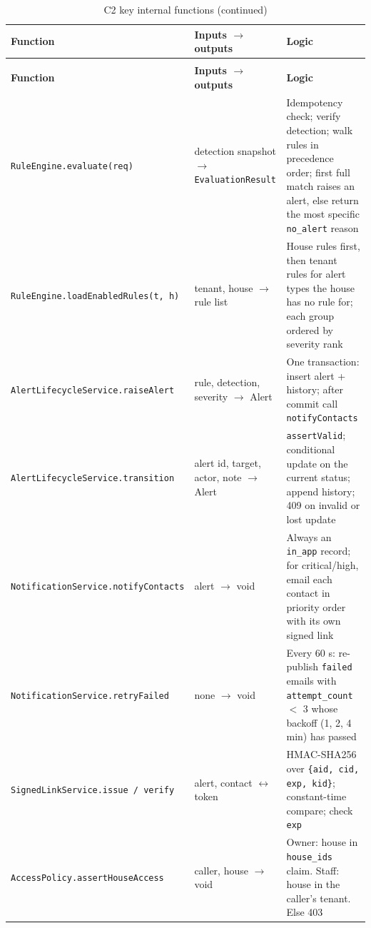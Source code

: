 \begin{longtable}{L{4.0cm}L{4.0cm}L{6.6cm}}
\caption{C2 key internal functions}\label{tab:c2-fn}\\
\toprule
\textbf{Function} & \textbf{Inputs $\rightarrow$ outputs} & \textbf{Logic} \\
\midrule
\endfirsthead
\caption[]{C2 key internal functions (continued)}\\
\toprule
\textbf{Function} & \textbf{Inputs $\rightarrow$ outputs} & \textbf{Logic} \\
\midrule
\endhead
\texttt{RuleEngine.\allowbreak evaluate(req)} & detection snapshot $\rightarrow$ \texttt{EvaluationResult} & Idempotency check; verify detection; walk rules in precedence order; first full match raises an alert, else return the most specific \texttt{no\_alert} reason \\
\texttt{RuleEngine.\allowbreak loadEnabledRules(t, h)} & tenant, house $\rightarrow$ rule list & House rules first, then tenant rules for alert types the house has no rule for; each group ordered by severity rank \\
\texttt{AlertLifecycleService.\allowbreak raiseAlert} & rule, detection, severity $\rightarrow$ Alert & One transaction: insert alert + history; after commit call \texttt{notifyContacts} \\
\texttt{AlertLifecycleService.\allowbreak transition} & alert id, target, actor, note $\rightarrow$ Alert & \texttt{assertValid}; conditional update on the current status; append history; 409 on invalid or lost update \\
\texttt{NotificationService.\allowbreak notifyContacts} & alert $\rightarrow$ void & Always an \texttt{in\_app} record; for critical/high, email each contact in priority order with its own signed link \\
\texttt{NotificationService.\allowbreak retryFailed} & none $\rightarrow$ void & Every 60 s: re-publish \texttt{failed} emails with \texttt{attempt\_count} $<$ 3 whose backoff (1, 2, 4 min) has passed \\
\texttt{SignedLinkService.\allowbreak issue / verify} & alert, contact $\leftrightarrow$ token & HMAC-SHA256 over \texttt{\{aid, cid, exp, kid\}}; constant-time compare; check \texttt{exp} \\
\texttt{AccessPolicy.\allowbreak assertHouseAccess} & caller, house $\rightarrow$ void & Owner: house in \texttt{house\_ids} claim. Staff: house in the caller's tenant. Else 403 \\
\bottomrule
\end{longtable}

